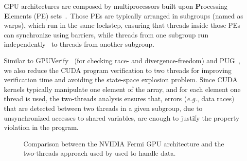 \documentclass[times, doublespace]{cpeauth}
\begin{document}
GPU architectures are composed by multiprocessors built upon \textbf{P}rocessing \textbf{E}lements (PE) sets~\cite{cuda:2012,cudaproguide:2015}.\ Those PEs are typically arranged in subgroups (named as warps), which run in the same lockstep, ensuring that threads inside those PEs can synchronize using barriers, while threads from one subgroup run independently~\cite{betts:2012} to threads from another subgroup. 

Similar to GPUVerify~\cite{betts:2012} (for checking race- and divergence-freedom) and PUG~\cite{Li:2010}, we also reduce the CUDA program verification to two threads for improving verification time and avoiding the state-space explosion problem. Since CUDA kernels typically manipulate one element of the array, and for each element one thread is used, the two-threads analysis ensures that, errors ({\it e.g.}, data races) that are detected between two threads in a given subgroup, due to unsynchronized accesses to shared variables, are enough to justify the property violation in the program.

   \begin{figure}[!htp]
   \centering
    \hspace{2em}
    \caption{Comparison between the NVIDIA Fermi GPU architecture and the two-threads approach used by used to handle data.}
    \label{fig:comparison}
  \end{figure}
  
\end{document}
